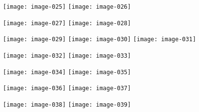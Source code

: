 \newpage

\begin{figure}[ht!]
    \center
    \texttt{[image: image-025]}
    \texttt{[image: image-026]}
\end{figure}

\newpage

\begin{figure}[ht!]
    \center
    \texttt{[image: image-027]}
    \texttt{[image: image-028]}
\end{figure}

\newpage

\begin{figure}[ht!]
    \center
    \texttt{[image: image-029]}
    \texttt{[image: image-030]}
    \texttt{[image: image-031]}
\end{figure}

\newpage

\begin{figure}[ht!]
    \center
    \texttt{[image: image-032]}
    \texttt{[image: image-033]}
\end{figure}

\newpage

\begin{figure}[ht!]
    \center
    \texttt{[image: image-034]}
    \texttt{[image: image-035]}
\end{figure}

\newpage

\begin{figure}[ht!]
    \center
    \texttt{[image: image-036]}
    \texttt{[image: image-037]}
\end{figure}

\newpage

\begin{figure}[ht!]
    \center
    \texttt{[image: image-038]}
    \texttt{[image: image-039]}
\end{figure}

\newpage

